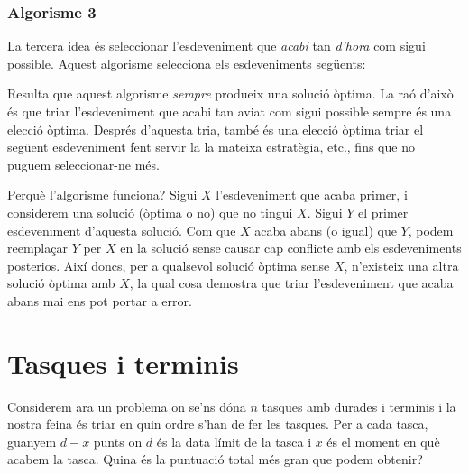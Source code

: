 \subsubsection*{Algorisme 3}

La tercera idea és seleccionar l'esdeveniment que
\emph{acabi} tan \emph{d'hora} com sigui possible.
Aquest algorisme selecciona els esdeveniments següents:
\begin{center}
\end{center}

Resulta que aquest algorisme
\emph{sempre} produeix una solució òptima.
La raó d'això és que triar l'esdeveniment que
acabi tan aviat com sigui possible sempre és
una elecció òptima.
Després d'aquesta tria, també és una elecció òptima
triar el següent esdeveniment fent servir la
la mateixa estratègia, etc.,
fins que no puguem seleccionar-ne més.

Perquè l'algorisme funciona?  Sigui $X$ l'esdeveniment que acaba
primer, i considerem una solució (òptima o no) que no tingui
$X$. Sigui $Y$ el primer esdeveniment d'aquesta solució. Com que $X$
acaba abans (o igual) que $Y$, podem reemplaçar $Y$ per $X$ en la
solució sense causar cap conflicte amb els esdeveniments posterios.
Així doncs, per a qualsevol solució òptima sense $X$, n'existeix una
altra solució òptima amb $X$, la qual cosa demostra que triar
l'esdeveniment que acaba abans mai ens pot portar a error.

\section{Tasques i terminis}

Considerem ara un problema on
se'ns dóna $n$ tasques amb durades i terminis
i la nostra feina és triar en quin ordre s'han de fer les tasques.
Per a cada tasca, guanyem $d-x$ punts
on $d$ és la data límit de la tasca
i $x$ és el moment en què acabem la tasca.
Quina és la puntuació total més gran
que podem obtenir?

